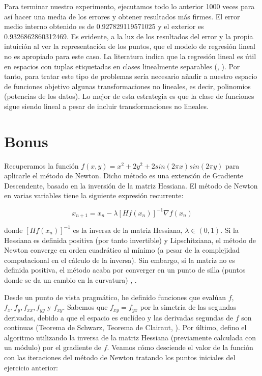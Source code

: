 Para terminar nuestro experimento, ejecutamos todo lo anterior 1000 veces para así hacer una media de los errores y obtener resultados más firmes. El error medio interno obtenido es de 0.927829119571025 y el exterior es  0.9326862860312469. Es evidente, a la luz de los resultados del error y la propia intuición al ver la representación de los puntos, que el modelo de regresión lineal no es apropiado para este caso. La literatura indica que la regresión lineal es útil en espacios con tuplas etiquetadas en clases linealmente separables (\cite{lfd}, \cite{ctm}). Por tanto, para tratar este tipo de problemas sería necesario añadir a nuestro espacio de funciones objetivo algunas transformaciones no lineales, es decir, polinomios (potencias de los datos). Lo mejor de esta estrategia es que la clase de funciones sigue siendo lineal a pesar de incluir transformaciones no lineales.

\section{Bonus}

Recuperamos la función $f(x,y)=x^2+2y^2+2sin(2\pi x) sin(2\pi y)$ para aplicarle el método de Newton. Dicho método es una extensión de Gradiente Descendente, basado en la inversión de la matriz Hessiana. El método de Newton en varias variables tiene la siguiente expresión recurrente:

$$ x_{n+1} = x_{n} - \lambda [Hf(x_n)]^{-1} \nabla f(x_n)$$

donde $[Hf(x_n)]^{-1}$ es la inversa de la matriz Hessiana, $\lambda \in (0,1)$. Si la Hessiana es definida positiva (por tanto invertible) y Lipschitziana, el método de Newton converge en orden cuadrático al mínimo (a pesar de la complejidad computacional en el cálculo de la inversa). Sin embargo, si la matriz no es definida positiva, el método acaba por converger en un punto de silla (puntos donde se da un cambio en la curvatura) \cite{pam}, \cite{np}.


Desde un punto de vista pragmático, he definido funciones que evalúan $f$, $f_x,f_y, f_{xx},f_{yy}$ y $f_{xy}$. Sabemos que $f_{xy} = f_{yx}$ por la simetría de las segundas derivadas, debido a que el espacio es euclídeo y las derivadas segundas de $f$ son continuas (Teorema de Schwarz, Teorema de Clairaut, \cite{rudin}). Por último, defino el algoritmo utilizando la inversa de la matriz Hessiana (previamente calculada con un módulo) por el gradiente de $f$. Veamos cómo desciende el valor de la función con las iteraciones del método de Newton tratando los puntos iniciales del ejercicio anterior:


